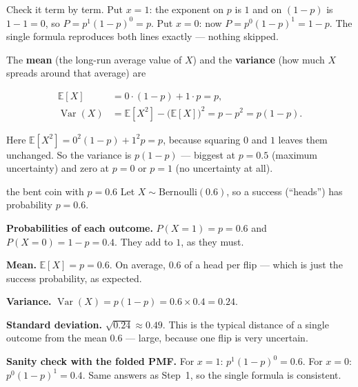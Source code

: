\documentclass[a4paper,11pt]{article}
\newcommand{\vocab}[1]{\textbf{#1}}
\begin{document}
Check it term by term. Put $x = 1$: the exponent on $p$ is $1$ and on $(1-p)$ is
$1-1 = 0$, so $P = p^{1}(1-p)^{0} = p$. Put $x = 0$: now $P = p^{0}(1-p)^{1} = 1-p$.
The single formula reproduces both lines exactly --- nothing skipped.

The \vocab{mean} (the long-run average value of $X$) and the \vocab{variance} (how
much $X$ spreads around that average) are

\begin{align}
  \mathbb{E}[X] &= 0\cdot(1-p) + 1\cdot p = p, \\
  \operatorname{Var}(X) &= \mathbb{E}[X^2] - \big(\mathbb{E}[X]\big)^2
     = p - p^2 = p(1-p).
\end{align}

Here $\mathbb{E}[X^2] = 0^2(1-p) + 1^2 p = p$, because squaring $0$ and $1$ leaves
them unchanged. So the variance is $p(1-p)$ --- biggest at $p = 0.5$ (maximum
uncertainty) and zero at $p = 0$ or $p = 1$ (no uncertainty at all).

\begin{worked}{the bent coin with $p = 0.6$}
Let $X \sim \text{Bernoulli}(0.6)$, so a success (``heads'') has probability
$p = 0.6$.
\begin{steps}
  \item \textbf{Probabilities of each outcome.}
        $P(X=1) = p = 0.6$ and $P(X=0) = 1-p = 0.4$. They add to $1$, as they
        must.
  \item \textbf{Mean.} $\mathbb{E}[X] = p = 0.6$. On average, $0.6$ of a head per
        flip --- which is just the success probability, as expected.
  \item \textbf{Variance.} $\operatorname{Var}(X) = p(1-p) = 0.6 \times 0.4 = 0.24$.
  \item \textbf{Standard deviation.} $\sqrt{0.24} \approx 0.49$. This is the
        typical distance of a single outcome from the mean $0.6$ --- large,
        because one flip is very uncertain.
  \item \textbf{Sanity check with the folded PMF.} For $x = 1$:
        $p^{1}(1-p)^{0} = 0.6$. For $x = 0$: $p^{0}(1-p)^{1} = 0.4$. Same answers
        as Step~1, so the single formula is consistent.
\end{steps}
\end{worked}
\end{document}
